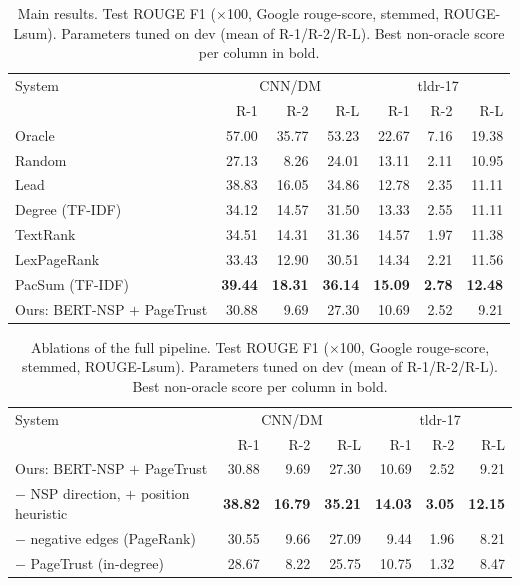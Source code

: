 \begin{table}[t]
\centering
\small
\begin{tabular}{lrrrrrr}
\toprule
System & \multicolumn{3}{c}{CNN/DM} & \multicolumn{3}{c}{tldr-17} \\
 & R-1 & R-2 & R-L & R-1 & R-2 & R-L \\
\midrule
Oracle & 57.00 & 35.77 & 53.23 & 22.67 & 7.16 & 19.38 \\
Random & 27.13 & 8.26 & 24.01 & 13.11 & 2.11 & 10.95 \\
Lead & 38.83 & 16.05 & 34.86 & 12.78 & 2.35 & 11.11 \\
Degree (TF-IDF) & 34.12 & 14.57 & 31.50 & 13.33 & 2.55 & 11.11 \\
TextRank & 34.51 & 14.31 & 31.36 & 14.57 & 1.97 & 11.38 \\
LexPageRank & 33.43 & 12.90 & 30.51 & 14.34 & 2.21 & 11.56 \\
PacSum (TF-IDF) & \textbf{39.44} & \textbf{18.31} & \textbf{36.14} & \textbf{15.09} & \textbf{2.78} & \textbf{12.48} \\
Ours: BERT-NSP $+$ PageTrust & 30.88 & 9.69 & 27.30 & 10.69 & 2.52 & 9.21 \\
\bottomrule
\end{tabular}
\caption{Main results. Test ROUGE F1 ($\times$100, Google rouge-score, stemmed, ROUGE-Lsum). Parameters tuned on dev (mean of R-1/R-2/R-L). Best non-oracle score per column in bold.}
\label{tab:main}
\end{table}

\begin{table}[t]
\centering
\small
\begin{tabular}{lrrrrrr}
\toprule
System & \multicolumn{3}{c}{CNN/DM} & \multicolumn{3}{c}{tldr-17} \\
 & R-1 & R-2 & R-L & R-1 & R-2 & R-L \\
\midrule
Ours: BERT-NSP $+$ PageTrust & 30.88 & 9.69 & 27.30 & 10.69 & 2.52 & 9.21 \\
$-$ NSP direction, $+$ position heuristic & \textbf{38.82} & \textbf{16.79} & \textbf{35.21} & \textbf{14.03} & \textbf{3.05} & \textbf{12.15} \\
$-$ negative edges (PageRank) & 30.55 & 9.66 & 27.09 & 9.44 & 1.96 & 8.21 \\
$-$ PageTrust (in-degree) & 28.67 & 8.22 & 25.75 & 10.75 & 1.32 & 8.47 \\
\bottomrule
\end{tabular}
\caption{Ablations of the full pipeline. Test ROUGE F1 ($\times$100, Google rouge-score, stemmed, ROUGE-Lsum). Parameters tuned on dev (mean of R-1/R-2/R-L). Best non-oracle score per column in bold.}
\label{tab:ablation}
\end{table}
